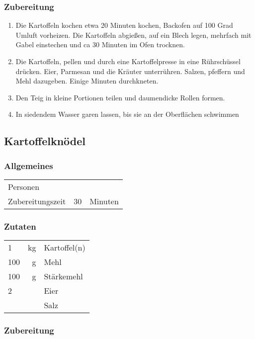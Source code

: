 \subsubsection*{Zubereitung}

\begin{enumerate}
    \item Die Kartoffeln kochen etwa 20 Minuten kochen, Backofen auf 100 Grad Umluft vorheizen. Die Kartoffeln abgießen, auf ein Blech legen, mehrfach mit Gabel einstechen und ca 30 Minuten im Ofen trocknen.
    \item Die Kartoffeln, pellen und durch eine Kartoffelpresse in eine Rührschüssel drücken. Eier, Parmesan und die Kräuter unterrühren.  Salzen, pfeffern und Mehl dazugeben. Einige Minuten durchkneten.
    \item  Den Teig in kleine Portionen teilen und daumendicke Rollen formen. 
    \item In siedendem Wasser garen lassen, bis sie an der Oberflächen schwimmen
\end{enumerate}




\subsection{Kartoffelknödel}\label{sec:Kartoffelknoedel}

\subsubsection*{Allgemeines}
\begin{tabular}{lrl}
    Personen         &    &  \\
    Zubereitungszeit &  30 & Minuten \\
\end{tabular} 

\subsubsection*{Zutaten}
\begin{tabular}{lrl}
    1   & kg & Kartoffel(n) \\
    100 &  g & Mehl         \\
    100 &  g & Stärkemehl   \\
    2   &    & Eier         \\
    &    & Salz
\end{tabular} 


\subsubsection*{Zubereitung}

